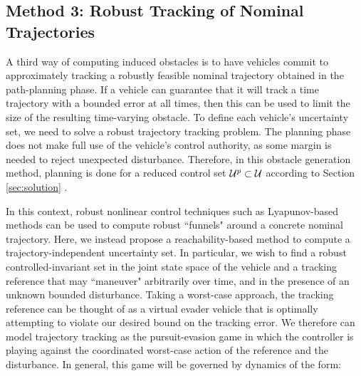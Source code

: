 \subsection{Method 3: Robust Tracking of Nominal Trajectories \label{sec:rtt}}
A third way of computing induced obstacles is to have vehicles commit to approximately tracking a robustly feasible nominal trajectory obtained in the path-planning phase. If a vehicle can guarantee that it will track a time trajectory with a bounded error at all times, then this can be used to limit the size of the resulting time-varying obstacle. To define each vehicle's uncertainty set, we need to solve a robust trajectory tracking problem.
The planning phase does not make full use of the vehicle's control authority, as some margin is needed to reject unexpected disturbance. Therefore, in this obstacle generation method, planning is done for a reduced control set $\mathcal{U}^p\subset\mathcal{U}$ according to Section \ref{sec:solution} .


In this context, robust nonlinear control techniques such as Lyapunov-based methods
\cite{Majumdar2013}%
can be used to compute robust ``funnels" around a concrete nominal trajectory.
Here, we instead propose a reachability-based method to compute a trajectory-independent uncertainty set. In particular, we wish to find a robust controlled-invariant set in the joint state space of the vehicle and a tracking reference that may ``maneuver" arbitrarily over time, and in the presence of an unknown bounded disturbance. Taking a worst-case approach, the tracking reference can be thought of as a virtual evader vehicle that is optimally attempting to violate our desired bound on the tracking error. We therefore can model trajectory tracking as the pursuit-evasion game in which the controller is playing against the coordinated worst-case action of the reference and the disturbance. In general, this game will be governed by dynamics of the form:

